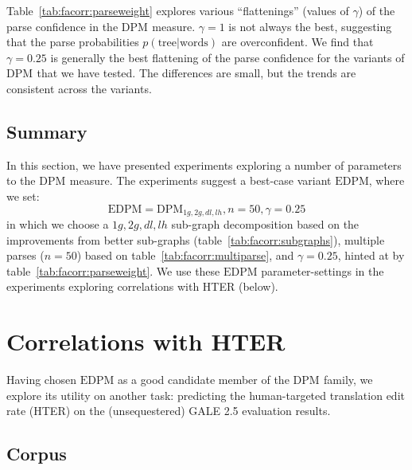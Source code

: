 \documentclass[11pt]{article}
\newcommand{\DPM}[1]{\ensuremath{\mathrm{DPM}_{#1}}}
\newcommand{\DPMempty}{\ensuremath{\DPM{}}}
\newcommand{\myEDPM}[0]{\ensuremath{\mathrm{EDPM}}}
\begin{document}
Table~\ref{tab:facorr:parseweight} explores various ``flattenings''
(values of $\gamma$) of the parse confidence in the \DPM{}
measure. $\gamma=1$ is not always the best, suggesting that the parse
probabilities $p(\mathrm{tree}|\mathrm{words})$ are overconfident. We
find that $\gamma=0.25$ is generally the best flattening of the parse
confidence for the variants of \DPM{} that we have tested.  The
differences are small, but the trends are consistent across the
variants.

\subsection{Summary}

In this section, we have presented experiments exploring a number of
parameters to the \DPMempty{} measure. The experiments suggest a
best-case variant \myEDPM{}, where we set:
\begin{displaymath}
  \myEDPM{} = \DPM{1g,2g,dl,lh}, n=50, \gamma=0.25
\end{displaymath}
in which we choose a $1g,2g,dl,lh$ sub-graph decomposition based on
the improvements from better sub-graphs
(table~\ref{tab:facorr:subgraphs}), multiple parses ($n=50$) based on
table~\ref{tab:facorr:multiparse}, and $\gamma=0.25$, hinted at by
table~\ref{tab:facorr:parseweight}.  We use these \myEDPM{}
parameter-settings in the experiments exploring correlations with HTER
(below).




\section{Correlations with HTER}
\label{sec:hter}

Having chosen \myEDPM{} as a good candidate member of the \DPMempty{}
family, we explore its utility on another task: predicting the
human-targeted translation edit rate (HTER) on the (unsequestered) GALE 2.5
evaluation results.

\subsection{Corpus}
\end{document}
